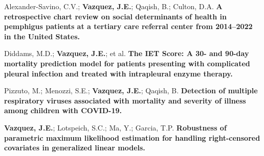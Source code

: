 \begin{cventries}
{\begin{etaremune}

    \item Alexander-Savino, C.V.; {\bf Vazquez, J.E.}; Qaqish, B.; Culton, D.A. \textbf{A retrospective chart review on social determinants of health in pemphigus patients at a tertiary care referral center from 2014--2022 in the United States.}
    
    \item Diddams, M.D.; {\bf Vazquez, J.E.}; et al. \textbf{The IET Score: A 30- and 90-day mortality prediction model for patients presenting with complicated pleural infection and treated with intrapleural enzyme therapy.}


    \item Pizzuto, M.; Menozzi, S.E.; {\bf Vazquez, J.E.}; Qaqish, B. \textbf{Detection of multiple respiratory viruses associated with mortality and severity of illness among children with COVID-19.}

    \item {\bf Vazquez, J.E.}; Lotspeich, S.C.; Ma, Y.; Garcia, T.P. \textbf{Robustness of parametric maximum likelihood estimation for handling right-censored covariates in generalized linear models.}

\end{etaremune}
}

\end{cventries}
